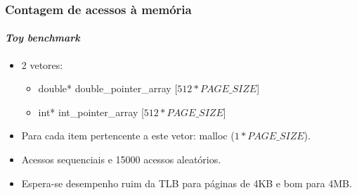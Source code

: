 \documentclass[10pt]{beamer}
\begin{document}
\begin{frame}
\frametitle{Contagem de acessos à memória}
\framesubtitle{\textit{Toy benchmark}}

\begin{itemize}
\item 2 vetores:
\begin{itemize}
  \item double*  double\_pointer\_array [\(512 * PAGE\_SIZE\)]
  \item int*  int\_pointer\_array [\(512 * PAGE\_SIZE\)]
\end{itemize}
\item Para cada item pertencente a este vetor: malloc (\(1*PAGE\_SIZE\)).
\vspace{12pt}
\item Acessos sequenciais e 15000 acessos aleatórios.
\vspace{12pt}
\item Espera-se desempenho ruim da TLB para páginas de 4KB e bom para
4MB.
\end{itemize}

\end{frame}
\end{document}
